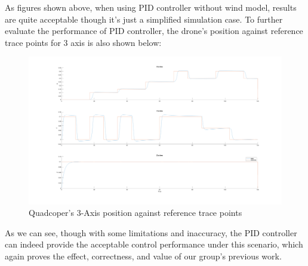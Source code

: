 \documentclass[12pt]{article}
\begin{document}
As figures shown above, when using PID controller without wind model, results are quite acceptable though it's just a simplified simulation case. To further evaluate the performance of PID controller, the drone's position against reference trace points for 3 axis is also shown below:
\begin{figure}[H]
    \centering
    \includegraphics[width=.5\linewidth]{figures/nus_word_xyz}
    \caption{Quadcoper's 3-Axis position against reference trace points}
    \label{fig:nus_word_xyz}
\end{figure}

As we can see, though with some limitations and inaccuracy, the PID controller can indeed provide the acceptable control performance under this scenario, which again proves the effect, correctness, and value of our group's previous work.

\newpage
{}

\end{document}
